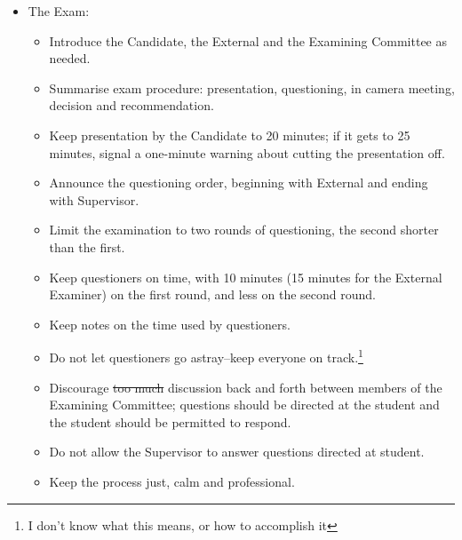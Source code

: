 \documentclass[12pt]{article}
\newcommand{\discuss}[1]{\footnote{\color{fixmeColor}#1\color{black}}\index{$>>>>$DISCUSS$<<<<$}}
\newcommand{\supervisor}{Supervisor\xspace}
\begin{document}
\begin{itemize}

    \item The Exam:

        \begin{itemize}

            \item Introduce the Candidate, the External and the Examining
                Committee as needed.

            \item Summarise exam procedure: presentation, questioning, in
                camera meeting, decision and recommendation.

            \item Keep presentation by the Candidate to 20 minutes; if it gets
                to 25 minutes, signal a one-minute warning about cutting
                the presentation off.

            \item Announce the questioning order, beginning with External and
                ending with \supervisor.

            \item Limit the examination to two rounds of questioning, the
                second shorter than the first.

            \item Keep questioners on time, with 10 minutes (15 minutes for the
                External Examiner) on the first round, and less on the second
                round.

            \item Keep notes on the time used by questioners.

            \item Do not let questioners go astray--keep everyone on
                track.\discuss{I don't know what this means, or how to
                accomplish it}

            \item Discourage \sout{too much} discussion back and forth between members
                of the Examining Committee; questions should be directed at the
                student and the student should be permitted to respond.

            \item Do not allow the \supervisor to answer questions directed at student.

            \item Keep the process just, calm and professional.


\end{itemize}
\end{itemize}
\end{document}
